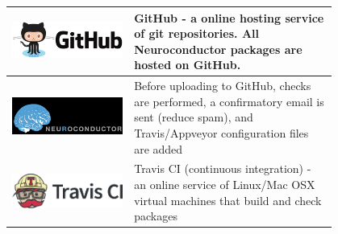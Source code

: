 \documentclass[final]{beamer}\usepackage[]{graphicx}\usepackage[]{color}
\begin{document}
\begin{frame}[fragile]
\begin{table}[!htb]
\begin{minipage}{0.36\linewidth}
\begin{center}
\begin{tabular}{m{0.3\linewidth}m{0.5\linewidth}}
\includegraphics[clip, scale=0.14, keepaspectratio]{figures/github-logo.png} 
& GitHub - a online hosting service of git repositories.  All Neuroconductor packages are hosted on GitHub.  \\ \hline
\includegraphics[clip, scale=0.8, keepaspectratio]{figures/neuroconductor_brain_type_bbg.png} 
& Before uploading to GitHub, checks are performed, a confirmatory email is sent (reduce spam), and Travis/Appveyor configuration files are added \\ \hline
\includegraphics[clip, scale=0.5, keepaspectratio]{figures/travis_logo.png} & Travis CI (continuous integration) - an online service of Linux/Mac OSX virtual machines that build and check packages  \\ \hline

\end{tabular}
\end{center}
\end{minipage}
\end{table}
\end{frame}
\end{document}
